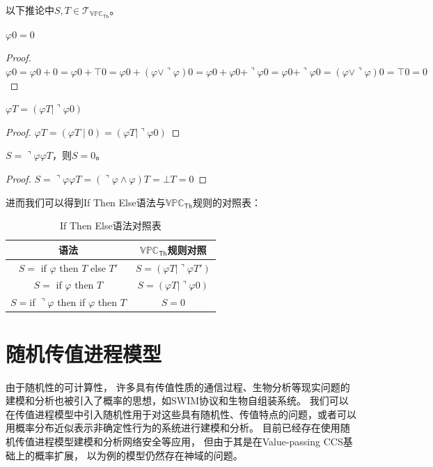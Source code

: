 以下推论中$S,T\in \mathcal{T}_{\mathbb{VPC}_\mathsf{Th}}$。
\begin{corollary} 
   $\varphi 0 = 0$
\end{corollary}
\begin{proof}
   $\varphi 0 = \varphi 0 + 0 = \varphi 0 + \top 0 = \varphi 0 + (\varphi \vee \urcorner \varphi)0 = \varphi 0 + \varphi 0 + \urcorner \varphi 0 = \varphi 0 + \urcorner \varphi 0 = (\varphi \vee \urcorner \varphi)0 = \top 0 = 0$
\end{proof}
\begin{corollary}
   $\varphi T = (\varphi T\mid \urcorner \varphi 0)$
\end{corollary}
\begin{proof}
   $\varphi T = (\varphi T\mid 0) = (\varphi T\mid \urcorner \varphi 0)$
\end{proof}
\begin{corollary}
   $S=\urcorner\varphi \varphi T$，则$S=0$。
\end{corollary}
\begin{proof}
   $S=\urcorner\varphi \varphi T = (\urcorner\varphi\wedge\varphi)T=\bot T=0$
\end{proof}
进而我们可以得到If Then Else语法与$\mathbb{VPC}_\mathsf{Th}$规则的对照表：
\begin{table}[!hpt]
   \caption[If Then Else语法对照表]{If Then Else语法对照表}
   \label{tab:ifthenelse}
   \centering
   \begin{tabular}{@{}cc@{}} \toprule
     语法 & $\mathbb{VPC}_{\mathsf{Th}}$规则对照 \\ \midrule
     $S=$ if $\varphi$ then $T$ else $T'$& $S=(\varphi T|\urcorner \varphi T')$\\
     $S=$ if $\varphi$ then $T$ & $S=(\varphi T|\urcorner\varphi 0)$\\
     $S = $if $\urcorner \varphi$ then if $\varphi$ then $T$ & $S=0$\\ \bottomrule
   \end{tabular}
 \end{table}

\section{随机传值进程模型}
由于随机性的可计算性，
许多具有传值性质的通信过程、生物分析等现实问题的建模和分析也被引入了概率的思想，如SWIM协议\cite{SWIM}和生物自组装系统\cite{BioProcess}。
我们可以在传值进程模型中引入随机性用于对这些具有随机性、传值特点的问题，或者可以用概率分布近似表示非确定性行为的系统进行建模和分析。
目前已经存在使用随机传值进程模型建模和分析网络安全\cite{NetworkSecurity}等应用，
但由于其是在Value-passing CCS\cite{Milner_CCS}基础上的概率扩展，
以\cite{NetworkSecurity,Prob_VPCCS}为例的模型仍然存在神域的问题。

